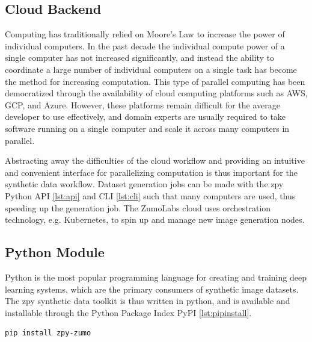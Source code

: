 \documentclass{article}
\begin{document}
\subsection{Cloud Backend}
\label{sec:cloudbackend}

Computing has traditionally relied on Moore’s Law to increase the power of individual computers. In the past decade the individual compute power of a single computer has not increased significantly, and instead the ability to coordinate a large number of individual computers on a single task has become the method for increasing computation. This type of parallel computing has been democratized through the availability of cloud computing platforms such as AWS, GCP, and Azure. However, these platforms remain difficult for the average developer to use effectively, and domain experts are usually required to take software running on a single computer and scale it across many computers in parallel.

Abstracting away the difficulties of the cloud workflow and providing an intuitive and convenient interface for parallelizing computation is thus important for the synthetic data workflow. Dataset generation jobs can be made with the zpy Python API \ref{lst:api} and CLI \ref{lst:cli} such that many computers are used, thus speeding up the generation job. The ZumoLabs cloud uses orchestration technology, e.g. Kubernetes, to spin up and manage new image generation nodes.

\subsection{Python Module}
\label{sec:pythonmodule}

Python is the most popular programming language for creating and training deep learning systems, which are the primary consumers of synthetic image datasets. The zpy synthetic data toolkit is thus written in python, and is available and installable through the Python Package Index PyPI \ref{lst:pipinstall}.

\begin{lstlisting}[language=bash,caption={Installing the zpy python module.},label={lst:pipinstall}]
pip install zpy-zumo
\end{lstlisting}
\end{document}
